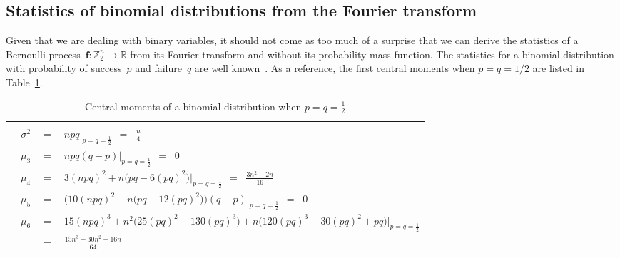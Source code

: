 \documentclass[letterpaper,11pt]{article}
\newcommand{\bs}[1]{{\boldsymbol{#1}}}
\newcommand{\gr}[1]{( #1 )}
\newcommand{\Gr}[1]{\big( #1 \big)}
\newcommand{\Real}{\mathbb R}
\newcommand{\Int}{\mathbb Z}
\theoremstyle{definition} \newtheorem{remark}{Remark}
\begin{document}
\subsection{Statistics of binomial distributions from the Fourier transform} \label{Sec:BinomialDist_Stats}
Given that we are dealing with binary variables, it should not come as too much of a surprise that we can derive the statistics of a Bernoulli process~$\bs{f}:\Int_2^n\rightarrow\Real$ from its Fourier transform and without its probability mass function. The statistics for a binomial distribution with probability of success~$p$ and failure~$q$ are well known~\cite{skorski2025handyBinomialFormulas}.
As a reference, the first central moments when $p=q=1/2$ are listed in Table~\ref{Tab:CentralMoments BinomDist}.

\begin{table}[!htb]
\centering
  \caption{Central moments of a binomial distribution when $p=q=\frac{1}{2}$} \label{Tab:CentralMoments BinomDist}
  \vspace{3pt}
  \begin{tabular}{|lrcl|}
  \hline
  & & & \\[-9pt]
  & $\sigma^2$ & $=$ & $\displaystyle npq\big|_{p=q=\frac{1}{2}} \,\;=\;\; \frac{n}{4}$ \\[10pt]
  & $\mu_3$ & $=$ & $\displaystyle npq\gr{q-p}\big|_{p=q=\frac{1}{2}} \,\;=\;\; 0$ \\[7pt]
  & $\mu_4$ & $=$ & $\displaystyle 3\gr{npq}^2 + n\Gr{pq - 6\gr{pq}^2}\big|_{p=q=\frac{1}{2}} \,\;=\;\; \frac{3n^2-2n}{16}$ \\[10pt]
  & $\mu_5$ & $=$ & $\displaystyle \Gr{10\gr{npq}^2 + n\Gr{pq - 12\gr{pq}^2}}\gr{q-p}\big|_{p=q=\frac{1}{2}} \,\;=\;\; 0$ \\[10pt]
  & $\mu_6$ & $=$ & $\displaystyle 15\gr{npq}^3 + n^2\Gr{25\gr{pq}^2 - 130\gr{pq}^3} + n\Gr{120\gr{pq}^3 - 30\gr{pq}^2 + pq}\big|_{p=q=\frac{1}{2}}$\; \\[7pt]
  & & $=$ & $\displaystyle \frac{15n^3 - 30n^2 + 16n}{64}$ \\[9pt]
\hline
\end{tabular}
\end{table}
\end{document}
